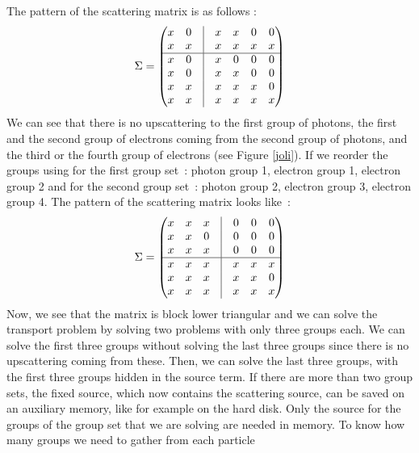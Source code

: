 The pattern of the scattering matrix is as follows :
\begin{equation}
\Sigma =
\begin{pmatrix}
x & 0 & \vline & x & x & 0 & 0\\
x & x & \vline & x & x & x & x\\
\hline     
x & 0 & \vline & x & 0 & 0 & 0\\
x & 0 & \vline & x & x & 0 & 0\\
x & x & \vline & x & x & x & 0\\
x & x & \vline & x & x & x & x\\
\end{pmatrix}
\end{equation}
We can see that there is no upscattering to the first group of photons, the
first and the second group of electrons coming from the second group of
photons, and the third or the fourth group of electrons (see Figure
\ref{joli}). If we reorder the groups using for the first group \hbox{set :} 
photon group 1, electron group 1, electron group 2 and for the second group 
\hbox{set :} photon group 2, electron group 3, electron group 4. The pattern 
of the scattering matrix looks \hbox{like :}
\begin{equation}
\Sigma =
\begin{pmatrix}
x & x & x & \vline & 0 & 0 & 0\\
x & x & 0 & \vline & 0 & 0 & 0\\
x & x & x & \vline & 0 & 0 & 0\\
\hline      
x & x & x & \vline & x & x & x\\
x & x & x & \vline & x & x & 0\\
x & x & x & \vline & x & x & x\\
\end{pmatrix}
\end{equation}
Now, we see that the matrix is block lower triangular and we can solve the
transport problem by solving two problems with only three groups each. 
We can solve the first three groups without solving the last three groups since 
there is no upscattering coming from these. Then, we can solve the last three 
groups, with the first three groups hidden in the source term. 
If there are more than two group sets, the fixed source,
which now contains the scattering source, can be saved on an auxiliary
memory, like for example on the hard disk. Only the source for the groups of the
group set that we are solving are needed in memory.
To know how many groups we need to gather from each particle 
